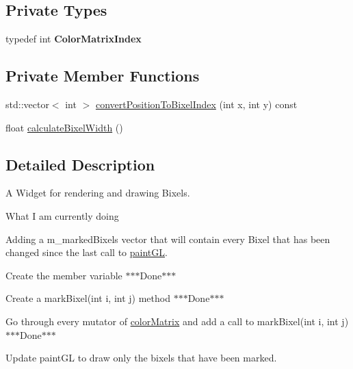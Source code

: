 \subsection*{Private Types}
\begin{DoxyCompactItemize}
\item 
\hypertarget{classGLWidget_a5a2947849a31320f39477d93511712e5}{typedef int {\bfseries Color\-Matrix\-Index}}\label{classGLWidget_a5a2947849a31320f39477d93511712e5}

\end{DoxyCompactItemize}
\subsection*{Private Member Functions}
\begin{DoxyCompactItemize}
\item 
std\-::vector$<$ int $>$ \hyperlink{classGLWidget_a7555011afa685031ca05eaebe7d673cc}{convert\-Position\-To\-Bixel\-Index} (int x, int y) const 
\item 
float \hyperlink{classGLWidget_a9e1d6025155e0e95331f3dd8a8a4db62}{calculate\-Bixel\-Width} ()
\end{DoxyCompactItemize}


\subsection{Detailed Description}
A Widget for rendering and drawing Bixels. 

\begin{DoxyRefDesc}{What I am currently doing}
\item[\hyperlink{task__task000002}{What I am currently doing}]Adding a m\-\_\-marked\-Bixels vector that will contain every Bixel that has been changed since the last call to \hyperlink{classGLWidget_a640b5570cb2b37724fd5b58a77339c5e}{paint\-G\-L}.
\begin{DoxyItemize}
\item Create the member variable $\ast$$\ast$$\ast$\-Done$\ast$$\ast$$\ast$
\item Create a mark\-Bixel(int i, int j) method $\ast$$\ast$$\ast$\-Done$\ast$$\ast$$\ast$
\item Go through every mutator of \hyperlink{classGLWidget_aab1b8762be4b33d384e3689427c2addc}{color\-Matrix} and add a call to mark\-Bixel(int i, int j) $\ast$$\ast$$\ast$\-Done$\ast$$\ast$$\ast$
\item Update paint\-G\-L to draw only the bixels that have been marked.
\end{DoxyItemize}\end{DoxyRefDesc}


